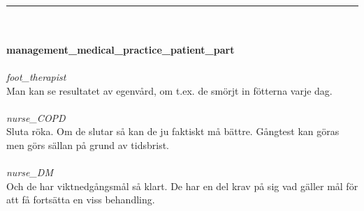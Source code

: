 \documentclass[12pt,a4paper,oneside]{article}
\begin{document}
\ \vspace{.66em}\\
\hrule
\ \vspace{.33em}\\
\ \\{\bf management\_medical\_practice\_patient\_part }
\\\ \\%
 { \it foot\_therapist %
}\\
Man kan se  resultatet av egenv{\aa}rd,  om t.ex. de sm{\"o}rjt in f{\"o}tterna varje dag. %
\ \\\ \\
 { \it   nurse\_COPD %
}\\
Sluta r{\"o}ka. Om de slutar s{\aa} kan de ju faktiskt m{\aa} b{\"a}ttre. G{\aa}ngtest kan g{\"o}ras men g{\"o}rs s{\"a}llan p{\aa} grund av tidsbrist. %
\ \\\ \\
 { \it   nurse\_DM %
}\\
Och de har viktnedg{\aa}ngsm{\aa}l s{\aa} klart. De har en del krav p{\aa} sig vad g{\"a}ller m{\aa}l f{\"o}r att f{\aa} forts{\"a}tta en viss behandling. %
\end{document}
